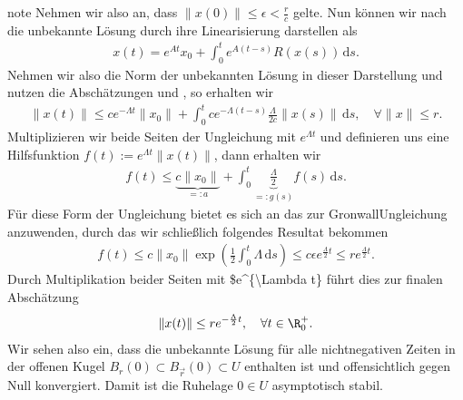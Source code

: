 \documentclass[letterpaper,10pt,english]{jupyterBook}
\begin{document}
\begin{sphinxadmonition}{note}
\sphinxAtStartPar
Nehmen wir also an, dass \(\|x(0)\| \leq \epsilon <\frac{r}{c}\) gelte.
Nun können wir nach  die unbekannte Lösung durch ihre Linearisierung darstellen als
\begin{equation*}
\begin{split}x(t) = e^{At}x_0 + \int_0^t e^{A(t-s)} R(x(s))\, \mathrm{d}s.\end{split}
\end{equation*}
\sphinxAtStartPar
Nehmen wir also die Norm der unbekannten Lösung in dieser Darstellung und nutzen die Abschätzungen {\hyperref[\detokenize{ode_stability/ruhelagen:equation-eq-abschaetzung-norm-exponential}]{}} und {\hyperref[\detokenize{ode_stability/ruhelagen:equation-eq-abschaetzung-residuum}]{}}, so erhalten wir
\begin{equation*}
\begin{split}\|x(t)\|\leq ce^{-\Lambda t}\|x_0\| + \int_0^tce^{-\Lambda (t-s)}\frac{\Lambda}{2c}\|x(s)\|\, \mathrm{d}s, \quad \forall \|x\| \leq r.\end{split}
\end{equation*}
\sphinxAtStartPar
Multiplizieren wir beide Seiten der Ungleichung mit \(e^{\Lambda t}\) und definieren uns eine Hilfsfunktion \(f(t):=e^{\Lambda t}\|x(t)\|\), dann erhalten wir
\begin{equation*}
\begin{split}f(t)\leq \underbrace{c\|x_0\|}_{=:a} + \int_0^t \underbrace{\frac{\Lambda}{2}}_{=:g(s)} f(s)\, \mathrm{d}s.\end{split}
\end{equation*}
\sphinxAtStartPar
Für diese Form der Ungleichung bietet es sich an das {\hyperref[\detokenize{ode_stability/ruhelagen:lemma:Gronwall}]{}} zur Gronwall\sphinxhyphen{}Ungleichung anzuwenden, durch das wir schließlich folgendes Resultat bekommen
\begin{equation*}
\begin{split}f(t) \leq c \|x_0\| \exp{\left( \frac{1}{2} \int_0^t \Lambda \, \mathrm{d}s \right) }
\leq c \epsilon e^{\frac{\Lambda}{2} t} \leq r e^{\frac{\Lambda}{2} t}.\end{split}
\end{equation*}
\sphinxAtStartPar
Durch Multiplikation beider Seiten mit \$e\textasciicircum{}\{\sphinxhyphen{}\textbackslash{}Lambda t\} führt dies zur finalen Abschätzung
\begin{equation*}
\begin{split} \|x(t)\|\leq re^{-\frac{\Lambda}{2}t}, \quad \forall t\in\R^+_0.\end{split}
\end{equation*}
\sphinxAtStartPar
Wir sehen also ein, dass die unbekannte Lösung für alle nicht\sphinxhyphen{}negativen Zeiten in der offenen Kugel \(B_r(0) \subset B_{\vec{r}}(0) \subset U\) enthalten ist und offensichtlich gegen Null konvergiert.
Damit ist die Ruhelage \(0 \in U\) asymptotisch stabil.
\end{sphinxadmonition}
\end{document}
